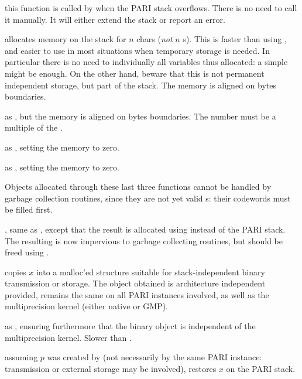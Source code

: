  this function is called by
 when the PARI stack overflows. There is no need to call it
manually. It will either extend the stack or report an  error.

 allocates memory on the stack for $n$
chars (\emph{not} $n$ s). This is faster than using ,
and easier to use in most situations when temporary storage is needed. In
particular there is no need to  individually all variables thus
allocated: a simple  might be enough. On the other hand,
beware that this is not permanent independent storage, but part of the stack.
The memory is aligned on  bytes boundaries.

 as ,
but the memory is aligned on  bytes boundaries. The number must
be a multiple of the .

 as , setting the memory
to zero.

 as
, setting the memory to zero.

\noindent Objects allocated through these last three functions cannot be
handled by garbage collection routines, since they are not yet valid
s: their codewords must be filled first.

, same as , except
that the result is allocated using  instead of the PARI
stack. The resulting  is now impervious to garbage collecting
routines, but should be freed using .


 copies $x$ into a malloc'ed structure suitable
for stack-independent binary transmission or storage. The object obtained
is architecture independent provided,  remains the same
on all PARI instances involved, as well as the multiprecision kernel (either
native or GMP).

 as , ensuring furthermore
that the binary object is independent of the multiprecision kernel. Slower
than .

 assuming $p$ was created by 
(not necessarily by the same PARI instance: transmission or external storage
may be involved), restores $x$ on the PARI stack.

